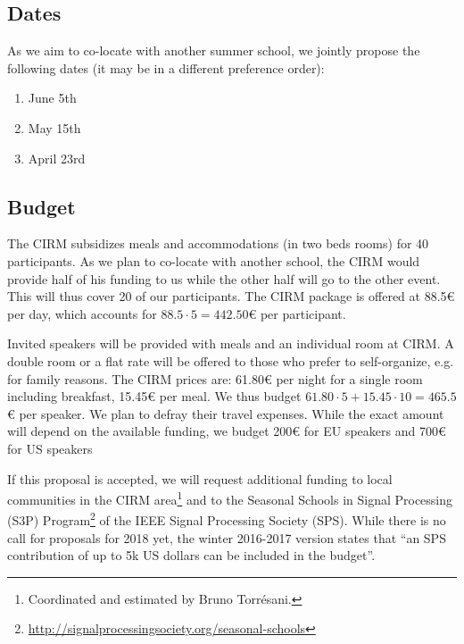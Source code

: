 \documentclass[a4paper]{scrartcl}
\begin{document}
\subsection{Dates}

As we aim to co-locate with another summer school, we jointly propose the
following dates (it may be in a different preference order):
\begin{enumerate}
	\setlength{\itemsep}{0pt} \setlength{\parskip}{0pt}
	\item June 5th
	\item May 15th
	\item April 23rd
\end{enumerate}

\subsection{Budget}

The CIRM subsidizes meals and accommodations (in two beds rooms) for 40
participants. As we plan to co-locate with another school, the CIRM would
provide half of his funding to us while the other half will go to the other
event. This will thus cover 20 of our participants. The CIRM package is offered
at 88.5€ per day, which accounts for $88.5 \cdot 5 = 442.50$€ per participant.

Invited speakers will be provided with meals and an individual room at CIRM. A
double room or a flat rate will be offered to those who prefer to self-organize,
e.g. for family reasons. The CIRM prices are: 61.80€ per night for a single room
including breakfast, 15.45€ per meal. We thus budget $61.80 \cdot 5 + 15.45
\cdot 10 = 465.5$€ per speaker. We plan to defray their travel expenses. While
the exact amount will depend on the available funding, we budget 200€ for EU
speakers and 700€ for US speakers

If this proposal is accepted, we will request additional funding to local
communities in the CIRM area\footnote{Coordinated and estimated by Bruno
Torrésani.} and to the Seasonal Schools in Signal Processing (S3P)
Program\footnote{\url{http://signalprocessingsociety.org/seasonal-schools}} of
the IEEE Signal Processing Society (SPS). While there is no call for proposals
for 2018 yet, the winter 2016-2017 version states that ``an SPS contribution of
up to 5k US dollars can be included in the budget''.
\end{document}
